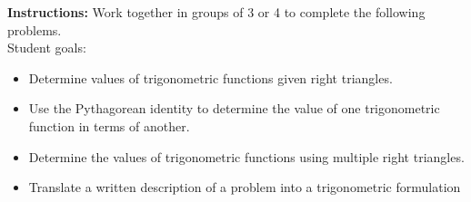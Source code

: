 




\noindent \textbf{Instructions:}  Work together in groups of  3 or 4 to complete the following problems.\\

Student goals:
\begin{itemize}
\item Determine values of trigonometric functions given right triangles.
\item Use the Pythagorean identity to determine the value of one
  trigonometric function in terms of another.
\item Determine the values of trigonometric functions using multiple
  right triangles.
\item Translate a written description of a problem into a
  trigonometric formulation
\end{itemize}



